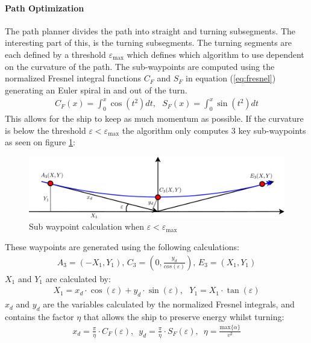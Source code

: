 \documentclass[a0,portrait]{a0poster}
\begin{document}
\begin{center}
{\paragraph{Path Optimization}
The path planner divides the path into straight and turning subsegments. The interesting part of this, is the turning subsegments. The turning segments are each defined by a threshold $\varepsilon_\text{max}$ which defines which algorithm to use dependent on the curvature of the path. The sub-waypoints are computed using the normalized Fresnel integral functions $C_F$ and $S_F$ in equation (\ref{eq:fresnel}) generating an Euler spiral in and out of the turn. 
\begin{align}
C_F(x) = \int_0^x \cos(t^2)dt,\,\,\,\,S_F(x) = \int_0^x \sin(t^2)dt
\label{eq:fresnel}
\end{align}
This allows for the ship to keep as much momentum as possible. If the curvature is below the threshold $\varepsilon < \varepsilon_\text{max}$ the algorithm only computes 3 key sub-waypoints as seen on figure \ref{fig:3points}:
\begin{figure}
	\centering %
	\includegraphics[width=\threecolwidth]{img/3points}
  	\caption{Sub waypoint calculation when $\varepsilon < \varepsilon_\text{max}$}
	\label{fig:3points}
\end{figure}
These waypoints are generated using the following calculations:
\begin{align}
A_3 = (-X_1,Y_1),\, C_3 = (0,\frac{y_d}{cos(\varepsilon)}),\, E_3 = (X_1,Y_1)
\end{align}
$X_1$ and $Y_1$ are calculated by:
\begin{align}
X_1 = x_d \cdot \cos(\varepsilon) + y_d \cdot \sin(\varepsilon),\,\,\,\, Y_1 = X_1 \cdot 	\tan(\varepsilon)
\end{align}
$x_d$ and $y_d$ are the variables calculated by the normalized Fresnel integrals, and contains the factor $\eta$ that allows the ship to preserve energy whilst turning:
\begin{align}
x_d = \frac{\pi}{\eta}\cdot C_F(\varepsilon),\,\,\, y_d = \frac{\pi}{\eta}\cdot S_F(\varepsilon),\,\,\, \eta = \frac{\text{max}\{\dot{\alpha}\}}{v^2}
\end{align}
}
\end{center}
\end{document}
